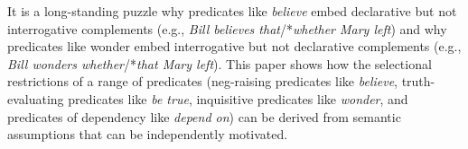 It is a long-standing puzzle why predicates like \textit{believe} embed declarative but not interrogative complements (e.g., \textit{Bill believes that}/*\textit{whether Mary left}) and why predicates like wonder embed interrogative but not declarative complements (e.g., \textit{Bill wonders whether}/*\textit{that Mary left}). This paper shows how the selectional restrictions of a range of predicates (neg-raising predicates like \textit{believe}, truth-evaluating predicates like \textit{be true}, inquisitive predicates like \textit{wonder}, and predicates of dependency like \textit{depend on}) can be derived from semantic assumptions that can be independently motivated.
\endinput